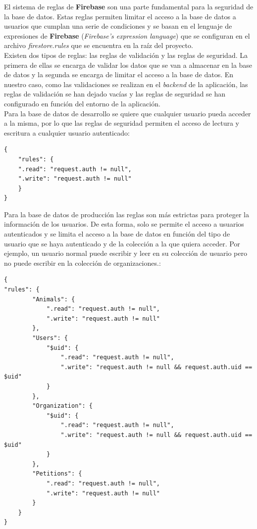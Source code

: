 El sistema de reglas de \textbf{Firebase} son una parte fundamental para la seguridad de la base de datos. Estas reglas
permiten limitar el acceso a la base de datos a usuarios que cumplan una serie de condiciones y se basan en el
lenguaje de expresiones de \textbf{Firebase} (\textit{Firebase's expression language}) que se configuran en
el archivo \textit{firestore.rules} que se encuentra en la raíz del proyecto. \\

Existen dos tipos de reglas: las reglas de validación y las reglas de seguridad. La primera de ellas se encarga de
validar los datos que se van a almacenar en la base de datos y la segunda se encarga de limitar el acceso a la base de datos.
En nuestro caso, como las validaciones se realizan en el \textit{backend} de la aplicación, las reglas de validación
se han dejado vacías y las reglas de seguridad se han configurado en función del entorno de la aplicación. \\

Para la base de datos de desarrollo se quiere que cualquier usuario pueda acceder a la misma, por lo que las reglas
de seguridad permiten el acceso de lectura y escritura a cualquier usuario autenticado:

\begin{lstlisting}
{
    "rules": {
    ".read": "request.auth != null",
    ".write": "request.auth != null"
    }
}
\end{lstlisting}

Para la base de datos de producción las reglas son más estrictas para proteger la información de los usuarios.
De esta forma, solo se permite el acceso a usuarios autenticados y se limita el acceso a la base de datos
en función del tipo de usuario que se haya autenticado y de la colección a la que quiera acceder. Por ejemplo, un usuario normal
puede escribir y leer en su colección de usuario pero no puede escribir en la colección de organizaciones.:

\newpage

\begin{lstlisting}
{
"rules": {
        "Animals": {
            ".read": "request.auth != null",
            ".write": "request.auth != null"
        },
        "Users": {
            "$uid": {
                ".read": "request.auth != null",
                ".write": "request.auth != null && request.auth.uid == $uid"
            }
        },
        "Organization": {
            "$uid": {
                ".read": "request.auth != null",
                ".write": "request.auth != null && request.auth.uid == $uid"
            }
        },
        "Petitions": {
            ".read": "request.auth != null",
            ".write": "request.auth != null"
        }
    }
}

\end{lstlisting}



